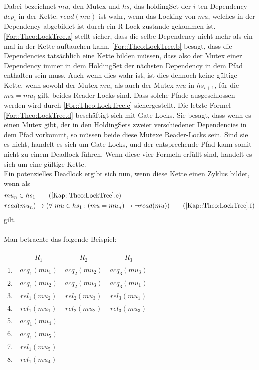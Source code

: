 Dabei bezeichnet $mu_i$ den Mutex und $hs_i$ das holdingSet der $i$-ten 
Dependency $dep_i$ in der Kette. $read(mu)$ ist wahr, wenn das Locking von $mu$, welches 
in der Dependency abgebildet ist durch ein R-Lock zustande gekommen ist.\\
\eqref{For::Theo:LockTree.a} stellt sicher, dass die selbe 
Dependency nicht mehr als ein mal in der Kette auftauchen kann.  
\eqref{For::Theo:LockTree.b} besagt, dass die Dependencies tatsächlich
eine Kette bilden müssen, dass also der Mutex einer Dependency immer in dem 
HoldingSet der nächsten Dependency in dem Pfad enthalten sein muss. 
Auch wenn dies wahr ist, ist dies dennoch keine gültige Kette, wenn sowohl der
Mutex $mu_i$ als auch der Mutex $mu$ in $hs_{i+1}$, für die $mu = mu_i$ gilt, 
beides Reader-Locks sind. Dass solche Pfade ausgeschlossen werden wird durch 
\eqref{For::Theo:LockTree.c} sichergestellt. Die letzte Formel 
\eqref{For::Theo:LockTree.d} beschäftigt sich mit Gate-Locks. 
Sie besagt, dass wenn es einen Mutex gibt, 
der in den HoldingSets zweier verschiedener Dependencies in dem Pfad vorkommt, 
so müssen beide diese Mutexe Reader-Locks sein. Sind sie es nicht, handelt es 
sich um Gate-Locks, und der entsprechende Pfad kann somit nicht zu einem 
Deadlock führen. Wenn diese vier Formeln erfüllt sind, handelt es sich um eine 
gültige Kette.\\
Ein potenzielles Deadlock ergibt sich nun, wenn diese Kette einen Zyklus 
bildet, wenn als 
\begin{align}
  &mu_n \in hs_{1} 
  \tag{\ref{Kap::Theo:LockTree}.e}
  \label{For::Implementation:Periodical.e}\\
  &read(mu_n) \rightarrow 
  (\forall\ mu \in hs_{1}: (mu = mu_n) \to \lnot read(mu))
  \tag{\ref{Kap::Theo:LockTree}.f}
  \label{For::Implementation:Periodical.f}
\end{align}
gilt.\\\\
Man betrachte das folgende Beispiel:
\begin{table}[H]
    \centering
    \begin{tabular}{cccc}
        & $R_1$           & $R_2$           & $R_3$\\
        1. & $acq_{1}(mu_1)$ & $acq_{2}(mu_2)$ & $acq_{3}(mu_3)$ \\
        2. & $acq_{1}(mu_2)$ & $acq_{2}(mu_3)$ & $acq_{3}(mu_1)$ \\
        3. & $rel_{1}(mu_2)$ & $rel_{2}(mu_3)$ & $rel_{3}(mu_1)$\\
        4. & $rel_{1}(mu_1)$ & $rel_{2}(mu_2)$ & $rel_{3}(mu_3)$\\
        5. & $acq_{1}(mu_4)$ &                 & \\
        6. & $acq_{1}(mu_5)$ &                 & \\
        7. & $rel_{1}(mu_5)$ &                 & \\
        8. & $rel_{1}(mu_4)$ &                 & \\
   \end{tabular}
\end{table}
